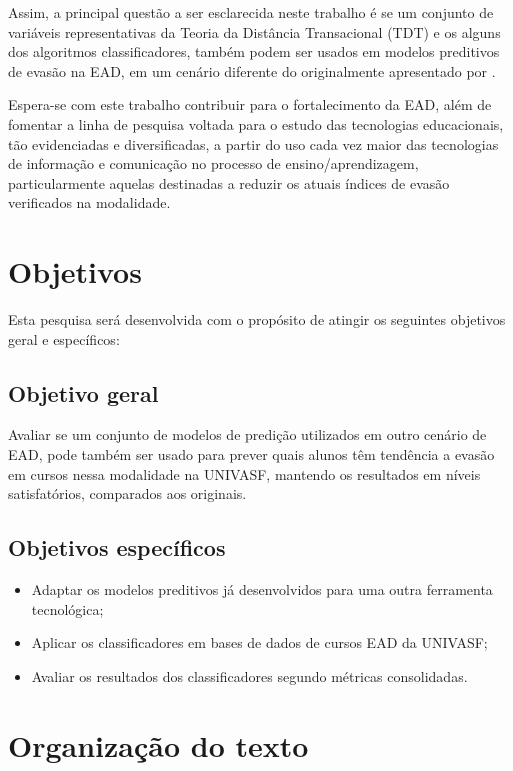 Assim, a principal questão a ser esclarecida neste trabalho é se um conjunto de
variáveis representativas da Teoria da Distância Transacional (TDT) e os alguns
dos algoritmos classificadores, também podem ser usados em modelos preditivos de
evasão na EAD, em um cenário diferente do originalmente apresentado por
.

Espera-se com este trabalho contribuir para o fortalecimento da EAD, além de
fomentar a linha de pesquisa voltada para o estudo das tecnologias educacionais,
tão evidenciadas e diversificadas, a partir do uso cada vez maior das
tecnologias de informação e comunicação no processo de ensino/aprendizagem,
particularmente aquelas destinadas a reduzir os atuais índices de evasão
verificados na modalidade.

\section{Objetivos}

Esta pesquisa será desenvolvida com o propósito de atingir os seguintes
objetivos geral e específicos:

\subsection{Objetivo geral}

Avaliar se um conjunto de modelos de predição utilizados em outro cenário
de EAD, pode também ser usado para prever quais alunos têm tendência a evasão em
cursos nessa modalidade na UNIVASF, mantendo os resultados em níveis
satisfatórios, comparados aos originais.

\subsection{Objetivos específicos}
\begin{itemize}
  \item Adaptar os modelos preditivos já desenvolvidos para uma outra ferramenta
  tecnológica;
  \item Aplicar os classificadores em bases de dados de cursos EAD da UNIVASF;
  \item Avaliar os resultados dos classificadores segundo métricas consolidadas.
\end{itemize}

\section{Organização do texto}

